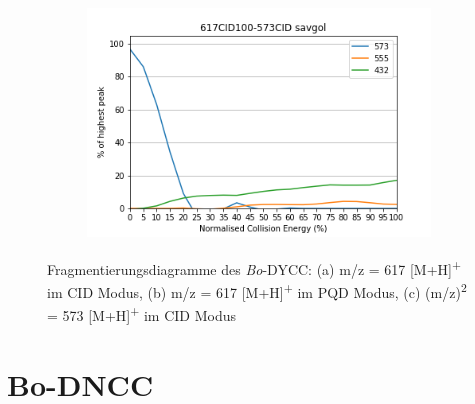 \begin{figure}[!htbp]
  \begin{subfigure}[b]{0.5\textwidth}
    \includegraphics[width=\textwidth]{content/Anhang/ESIMS/Bo-DYCC/617CID100-573CID-573savgol.png}
    \caption{}
  \end{subfigure}
  
  \caption[Fragmentierungsdiagramme des \textit{Bo}-DYCC, Quelle: Autor]{Fragmentierungsdiagramme des \textit{Bo}-DYCC: (a) m/z = 617 [M+H]\textsuperscript{+} im CID Modus, (b) m/z = 617 [M+H]\textsuperscript{+} im PQD Modus, (c) (m/z)\textsuperscript{2} = 573 [M+H]\textsuperscript{+} im CID Modus}
\end{figure}

\pagebreak
\section{Bo-DNCC}

